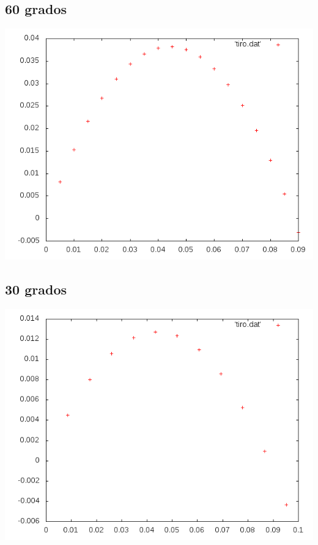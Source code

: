 \documentclass[10pt]{article}
\begin{document}
\subsection{60 grados}
\begin{center}
   \includegraphics[scale=0.5]{tiro60.png}
\end{center}

\subsection{30 grados}
\begin{center}
   \includegraphics[scale=0.5]{tiro30.png}
\end{center}













\end{document}
